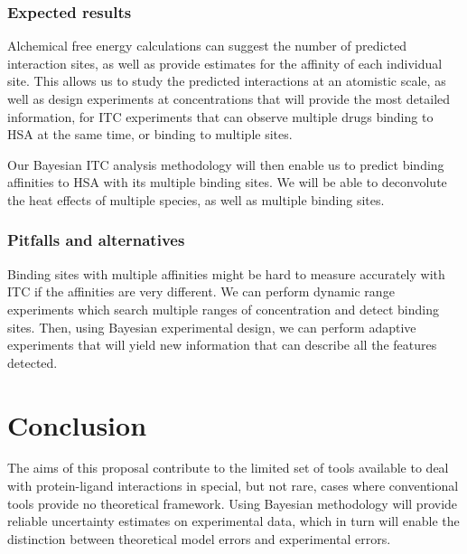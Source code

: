 \documentclass[10pt,final]{article}
\begin{document}
\subsubsection*{Expected results}
Alchemical free energy calculations can suggest the number of predicted interaction sites, as well as provide estimates for the affinity of each individual site.
This allows us to study the predicted interactions at an atomistic scale, as well as design experiments at concentrations that will provide the most detailed information, for ITC experiments that can observe multiple drugs binding to HSA at the same time, or binding to multiple sites.


Our Bayesian ITC analysis methodology will then enable us to predict binding affinities to HSA with its multiple binding sites. We will be able to deconvolute the heat effects of multiple species, as well as multiple binding sites.

\subsubsection*{Pitfalls and alternatives}
Binding sites with multiple affinities might be hard to measure accurately with ITC if the affinities are very different. We can perform dynamic range experiments which search multiple ranges of concentration and detect binding sites. Then, using Bayesian experimental design, we can perform adaptive experiments that will yield new information that can describe all the features detected.


\section*{Conclusion}
The aims of this proposal contribute to the limited set of tools available to deal with protein-ligand interactions in special, but not rare, cases where conventional tools provide no theoretical framework. Using Bayesian methodology will provide reliable uncertainty estimates on experimental data, which in turn will enable the distinction between theoretical model errors and experimental errors.

\setlength{\emergencystretch}{1em}
\printbibliography
\end{document}
